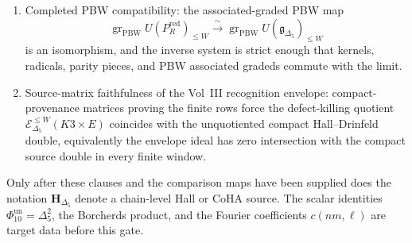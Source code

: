 \begin{definition}
\begin{enumerate}[label=\textup{(\roman*)}]
\item Completed PBW compatibility: the associated-graded PBW map
\[
\operatorname{gr}_{\mathrm{PBW}}U(P^{\mathrm{red}}_R)_{\le W}
\xrightarrow{\ \sim\ }
\operatorname{gr}_{\mathrm{PBW}}U(\mathfrak g_{\Delta_5})_{\le W}
\]
is an isomorphism, and the inverse system is strict enough that
kernels, radicals, parity pieces, and PBW associated gradeds commute
with the limit.
\item Source-matrix faithfulness of the Vol~III recognition envelope:
compact-provenance matrices proving the finite rows force the
defect-killing quotient
\(\mathcal E^{\le W}_{\Delta_5}(K3\times E)\) coincides with the
unquotiented compact Hall--Drinfeld double, equivalently the envelope
ideal has zero intersection with the compact source double in every
finite window.
\end{enumerate}
Only after these clauses and the comparison maps have been supplied
does the notation $\mathbf H_{\Delta_5}$ denote a chain-level Hall or
CoHA source. The scalar identities
$\Phi_{10}^{\mathrm{un}}=\Delta_5^2$, the Borcherds product, and the
Fourier coefficients $c(nm,\ell)$ are target data before this gate.
\end{definition}

